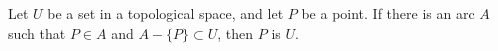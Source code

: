 Let $U$ be a set in a topological space, and let $P$ be a point. If there is an arc $A$ such that $P \in A$ and $A - \{P\} \subset U$, then $P$ is  $U$.
